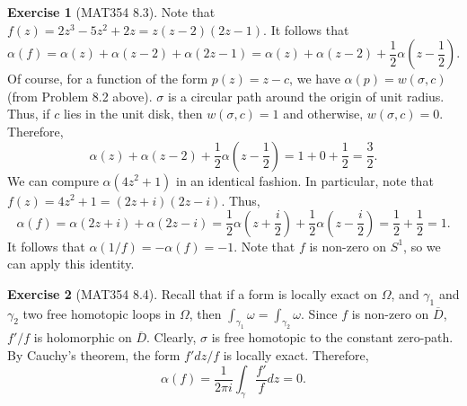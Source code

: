 \documentclass[aps,pra,showpacs,notitlepage,onecolumn,superscriptaddress,nofootinbib]{revtex4-1}
\theoremstyle{definition}
\newtheorem{exercise}{Exercise}[section]
\newcommand{\hhrulefill}{\hspace{-1.5em} \hrulefill}
\begin{document}
\begin{exercise}[MAT354 8.3]
  Note that $f(z) = 2z^3 - 5z^2 + 2z = z (z - 2)(2z - 1)$. It follows that
  $$\alpha(f) = \alpha(z) + \alpha(z - 2) + \alpha(2z - 1) = \alpha(z) + \alpha(z - 2) + \frac{1}{2} \alpha\left( z - \frac{1}{2} \right).$$
  Of course, for a function of the form $p(z) = z - c$, we have $\alpha(p) = w(\sigma, c)$ (from Problem 8.2 above). $\sigma$ is a circular path
  around the origin of unit radius. Thus, if $c$ lies in the unit disk, then $w(\sigma, c) = 1$ and otherwise, $w(\sigma, c) = 0$. Therefore,
  \begin{equation}
    \alpha(z) + \alpha(z - 2) + \frac{1}{2} \alpha\left( z - \frac{1}{2} \right) = 1 + 0 + \frac{1}{2} = \frac{3}{2}.
  \end{equation}
  We can compure $\alpha(4z^2 + 1)$ in an identical fashion. In particular, note that $f(z) = 4z^2 + 1 = (2z + i)(2z - i)$. Thus,
  \begin{equation}
    \alpha(f) = \alpha(2z + i) + \alpha(2z - i) = \frac{1}{2} \alpha\left(z + \frac{i}{2} \right) + \frac{1}{2} \alpha \left( z - \frac{i}{2} \right) = \frac{1}{2} + \frac{1}{2} = 1.
  \end{equation}
  It follows that $\alpha(1/f) = -\alpha(f) = -1$. Note that $f$ is non-zero on $S^1$, so we can apply this identity.
\end{exercise}

\hhrulefill

\begin{exercise}[MAT354 8.4]
  Recall that if a form is locally exact on $\Omega$, and $\gamma_1$ and $\gamma_2$ two free homotopic loops in $\Omega$, then $\int_{\gamma_1} \omega = \int_{\gamma_2} \omega$.
  Since $f$ is non-zero on $\overline{D}$, $f'/f$ is holomorphic on $\overline{D}$. Clearly, $\sigma$ is free homotopic to the constant zero-path. By Cauchy's theorem, the form $f' dz / f$ is locally exact.
  Therefore,
  \begin{equation}
    \alpha(f) = \frac{1}{2\pi i} \displaystyle\int_{\gamma} \frac{f'}{f} dz = 0.
    \end{equation}
  \end{exercise}

\hhrulefill
\end{document}
